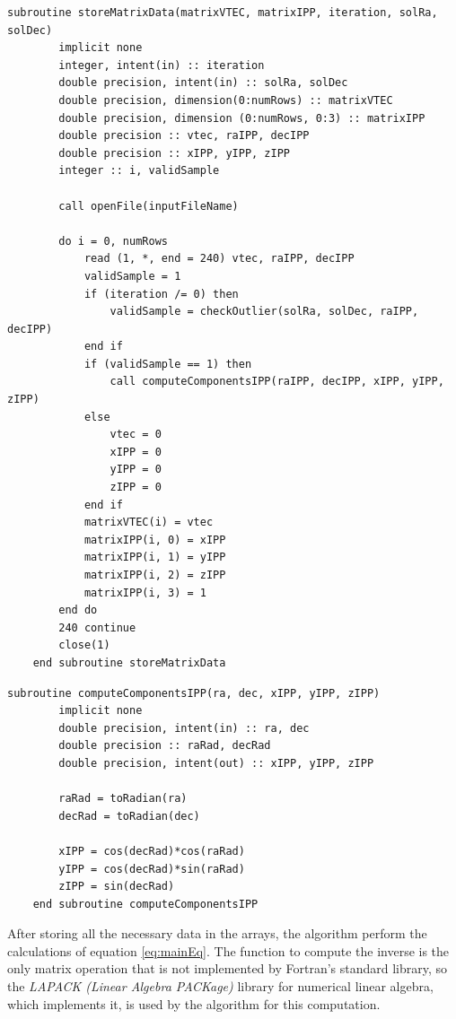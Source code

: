 \begin{minipage}{\linewidth}
	\label{lst:storeData}
	\begin{lstlisting}[style=myFortranStyle, caption=Storing the data from the input file]
	subroutine storeMatrixData(matrixVTEC, matrixIPP, iteration, solRa, solDec)
		implicit none
		integer, intent(in) :: iteration
		double precision, intent(in) :: solRa, solDec
		double precision, dimension(0:numRows) :: matrixVTEC
		double precision, dimension (0:numRows, 0:3) :: matrixIPP
		double precision :: vtec, raIPP, decIPP
		double precision :: xIPP, yIPP, zIPP
		integer :: i, validSample
		
		call openFile(inputFileName)
		
		do i = 0, numRows
			read (1, *, end = 240) vtec, raIPP, decIPP
			validSample = 1
			if (iteration /= 0) then
				validSample = checkOutlier(solRa, solDec, raIPP, decIPP)
			end if
			if (validSample == 1) then
				call computeComponentsIPP(raIPP, decIPP, xIPP, yIPP, zIPP)
			else
				vtec = 0
				xIPP = 0
				yIPP = 0
				zIPP = 0
			end if
			matrixVTEC(i) = vtec
			matrixIPP(i, 0) = xIPP
			matrixIPP(i, 1) = yIPP
			matrixIPP(i, 2) = zIPP
			matrixIPP(i, 3) = 1
		end do
		240 continue
		close(1)
	end subroutine storeMatrixData\end{lstlisting}
\end{minipage}

\begin{minipage}{\linewidth}
	\label{lst:computeComponents}
	\begin{lstlisting}[style=myFortranStyle, caption=Compute the components of the IPP's unit vector]
	subroutine computeComponentsIPP(ra, dec, xIPP, yIPP, zIPP)
		implicit none
		double precision, intent(in) :: ra, dec
		double precision :: raRad, decRad
		double precision, intent(out) :: xIPP, yIPP, zIPP
		
		raRad = toRadian(ra)
		decRad = toRadian(dec)
		
		xIPP = cos(decRad)*cos(raRad)
		yIPP = cos(decRad)*sin(raRad)
		zIPP = sin(decRad)
	end subroutine computeComponentsIPP\end{lstlisting}
\end{minipage}

After storing all the necessary data in the arrays, the algorithm perform the calculations of equation \ref{eq:mainEq}. The function to compute the inverse is the only matrix operation that is not implemented by Fortran's standard library, so the \textit{LAPACK (Linear Algebra PACKage)} library for numerical linear algebra\cite{lapack}, which implements it, is used by the algorithm for this computation. 

